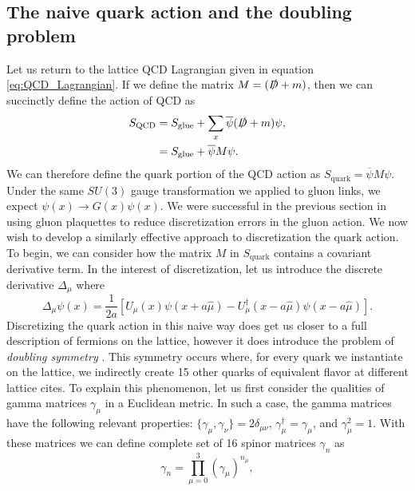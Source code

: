 \subsection{The naive quark action and the doubling problem}\label{sec:naive_quark_action}
Let us return to the lattice QCD Lagrangian given in equation \ref{eq:QCD_Lagrangian}. If we define the matrix $M = (\slashed{D} + m)$, then we can succinctly define the action of QCD as 
\begin{equation}\label{eq:QCD_action}
    \begin{split}
        S_\mathrm{QCD} &= S_\mathrm{glue} + \sum_x \overline{\psi}  (\slashed{D} + m)\psi, \\
          &= S_\mathrm{glue} + \overline{\psi}M\psi.
    \end{split}
\end{equation}
We can therefore define the quark portion of the QCD action as $S_\mathrm{quark} = \overline{\psi}M\psi$.  Under the same $SU(3)$ gauge transformation we applied to gluon links, we expect $\psi(x) \rightarrow G(x)\psi(x)$.  We were successful in the previous section in using gluon plaquettes to reduce discretization errors in the gluon action.  We now wish to develop a similarly effective approach to discretization the quark action.  To begin, we can consider how the matrix $M$ in $S_\mathrm{quark}$ contains a covariant derivative term.  In the interest of discretization, let us introduce the discrete derivative $\Delta_\mu$ where
\begin{equation}\label{eq:discrete_derivative_on_quark}
    \Delta_\mu \psi(x) = \frac{1}{2a} \left[ 
    U_\mu(x)\psi(x+a\hat{\mu}) - U^\dagger_\mu(x-a\hat\mu)\psi(x-a\hat\mu)
    \right].
\end{equation}
Discretizing the quark action in this naive way does get us closer to a full description of fermions on the lattice, however it does introduce the problem of \textit{doubling symmetry} \cite{KARSTEN1981103, KAWAMOTO1981100}.  This symmetry occurs where, for every quark we instantiate on the lattice, we indirectly create 15 other quarks of equivalent flavor at different lattice cites.   To explain this phenomenon, let us first consider the qualities of gamma matrices $\gamma_\mu$ in a Euclidean metric.  In such a case, the gamma matrices have the following relevant properties: $\{\gamma_\mu,\gamma_\nu\}=2\delta_{\mu\nu}$, $\gamma^\dagger_\mu = \gamma_\mu$, and $\gamma_\mu^2=1$.  With these matrices we can define complete set of 16 spinor matrices $\gamma_n$ as
\begin{equation}\label{eq:spinors}
    \gamma_n = \prod_{\mu=0}^3 (\gamma_\mu)^{n_\mu},
\end{equation}
